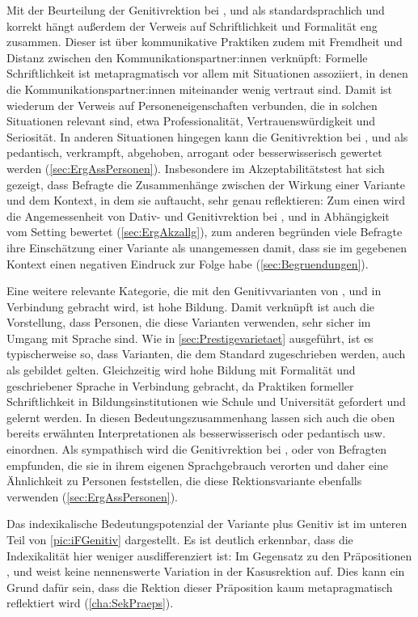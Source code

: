 Mit der Beurteilung der Genitivrektion bei \wegen, \waehrend{} und \dank{} als standardsprachlich und korrekt hängt außerdem der Verweis auf Schriftlichkeit und Formalität eng zusammen. 
Dieser ist über kommunikative Praktiken zudem mit Fremdheit und Distanz zwischen den Kommunikationspartner:innen verknüpft: 
Formelle Schriftlichkeit ist metapragmatisch vor allem mit Situationen assoziiert, in denen die Kommunikationspartner:innen miteinander wenig vertraut sind.  
Damit ist wiederum der Verweis auf Personeneigenschaften verbunden, die in solchen Situationen relevant sind, etwa Professionalität, Vertrauenswürdigkeit und Seriosität. 
In anderen Situationen hingegen kann die Genitivrektion bei \wegen, \waehrend{} und \dank{} als pedantisch, verkrampft, abgehoben, arrogant oder besserwisserisch gewertet werden (\autoref{sec:ErgAssPersonen}). 
Insbesondere im Akzeptabilitätstest hat sich gezeigt, dass Befragte die Zusammenhänge zwischen der Wirkung einer Variante und dem Kontext, in dem sie auftaucht, sehr genau reflektieren: 
Zum einen wird die Angemessenheit von Dativ- und Genitivrektion bei \wegen{}, \waehrend{} und \dank{} in Abhängigkeit vom Setting bewertet (\autoref{sec:ErgAkzallg}), zum anderen begründen viele Befragte ihre Einschätzung einer Variante als unangemessen damit, dass sie im gegebenen Kontext einen negativen Eindruck zur Folge habe (\autoref{sec:Begruendungen}). 

Eine weitere relevante Kategorie, die mit den Genitivvarianten von \wegen, \waehrend{} und \dank{} in Verbindung gebracht wird, ist hohe Bildung.
Damit verknüpft ist auch die Vorstellung, dass Personen, die diese Varianten verwenden, sehr sicher im Umgang mit Sprache sind. 
Wie in \autoref{sec:Prestigevarietaet} ausgeführt, ist es typischerweise so, dass Varianten, die dem Standard zugeschrieben werden, auch als gebildet gelten. 
Gleichzeitig wird hohe Bildung mit Formalität und geschriebener Sprache in Verbindung gebracht, da Praktiken formeller Schriftlichkeit in Bildungsinstitutionen wie Schule und Universität gefordert und gelernt werden. 
In diesen Bedeutungszusammenhang lassen sich auch die oben bereits erwähnten Interpretationen als besserwisserisch oder pedantisch usw. einordnen. 
Als sympathisch wird die Genitivrektion bei \wegen{}, \waehrend{} oder \dank{} von Befragten empfunden, die sie in ihrem eigenen Sprachgebrauch verorten und daher eine Ähnlichkeit zu Personen feststellen, die diese Rektionsvariante ebenfalls verwenden (\autoref{sec:ErgAssPersonen}). 

Das indexikalische Bedeutungspotenzial der Variante \gegenueber{} plus Genitiv ist im unteren Teil von \autoref{pic:iFGenitiv} dargestellt. 
Es ist deutlich erkennbar, dass die Indexikalität hier weniger ausdifferenziert ist: 
Im Gegensatz zu den Präpositionen \wegen, \waehrend{} und \dank{} weist \gegenueber{} keine nennenswerte Variation in der Kasusrektion auf.
Dies kann ein Grund dafür sein, dass die Rektion dieser Präposition kaum metapragmatisch reflektiert wird (\autoref{cha:SekPraeps}). 

